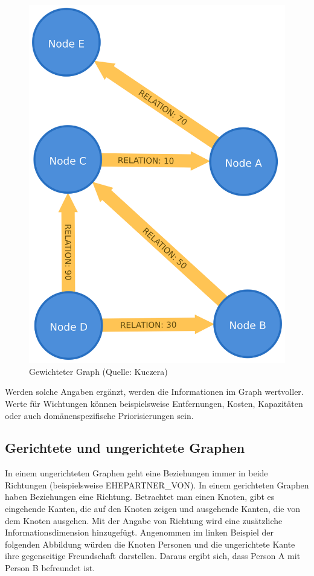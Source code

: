\documentclass[ngerman,]{scrreprt}
\begin{document}
\begin{figure}
\centering
\includegraphics{Bilder/weightedGraph.png}
\caption{Gewichteter Graph (Quelle: Kuczera)}
\end{figure}

Werden solche Angaben ergänzt, werden die Informationen im Graph wertvoller. Werte für Wichtungen können beispielsweise Entfernungen, Kosten, Kapazitäten oder auch domänenspezifische Priorisierungen sein.

\hypertarget{gerichtete-und-ungerichtete-graphen}{%
\subsection{Gerichtete und ungerichtete Graphen}\label{gerichtete-und-ungerichtete-graphen}}

In einem ungerichteten Graphen geht eine Beziehungen immer in beide Richtungen (beispielsweise EHEPARTNER\_VON). In einem gerichteten Graphen haben Beziehungen eine Richtung. Betrachtet man einen Knoten, gibt es eingehende Kanten, die auf den Knoten zeigen und ausgehende Kanten, die von dem Knoten ausgehen. Mit der Angabe von Richtung wird eine zusätzliche Informationsdimension hinzugefügt. Angenommen im linken Beispiel der folgenden Abbildung würden die Knoten Personen und die ungerichtete Kante ihre gegenseitige Freundschaft darstellen. Daraus ergibt sich, dass Person A mit Person B befreundet ist.
\end{document}
